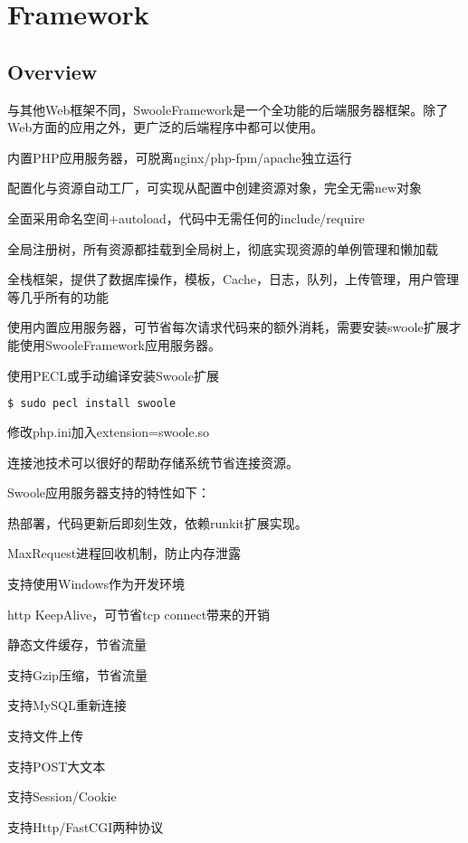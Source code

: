 \part{Framework}


\chapter{Overview}


与其他Web框架不同，SwooleFramework是一个全功能的后端服务器框架。除了Web方面的应用之外，更广泛的后端程序中都可以使用。


\begin{compactitem}
\item 内置PHP应用服务器，可脱离nginx/php-fpm/apache独立运行
\item 配置化与资源自动工厂，可实现从配置中创建资源对象，完全无需new对象
\item 全面采用命名空间+autoload，代码中无需任何的include/require
\item 全局注册树，所有资源都挂载到全局树上，彻底实现资源的单例管理和懒加载
\item 全栈框架，提供了数据库操作，模板，Cache，日志，队列，上传管理，用户管理等几乎所有的功能
\end{compactitem}

使用内置应用服务器，可节省每次请求代码来的额外消耗，需要安装swoole扩展才能使用SwooleFramework应用服务器。

\begin{compactenum}
\item 使用PECL或手动编译安装Swoole扩展

\begin{lstlisting}[language=bash]
$ sudo pecl install swoole
\end{lstlisting}

\item 修改php.ini加入extension=swoole.so
\end{compactenum}

连接池技术可以很好的帮助存储系统节省连接资源。

Swoole应用服务器支持的特性如下：

\begin{compactitem}
\item 热部署，代码更新后即刻生效，依赖runkit扩展实现。
\item MaxRequest进程回收机制，防止内存泄露
\item 支持使用Windows作为开发环境
\item http KeepAlive，可节省tcp connect带来的开销
\item 静态文件缓存，节省流量
\item 支持Gzip压缩，节省流量
\item 支持MySQL重新连接
\item 支持文件上传
\item 支持POST大文本
\item 支持Session/Cookie
\item 支持Http/FastCGI两种协议
\end{compactitem}

